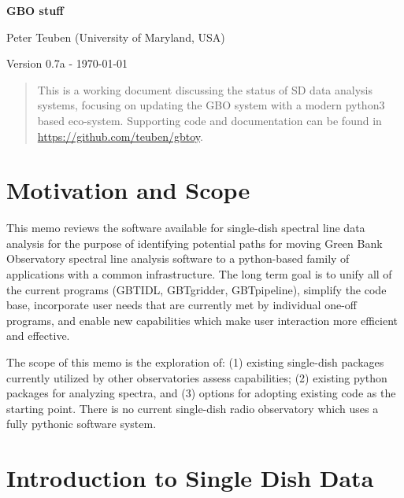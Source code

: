 \documentclass[12pt,a4paper]{article}
\begin{document}
\pagestyle{plain}
 

\begin{center}
{\Large{\bf{  GBO stuff  \\  }}} 

\end{center}
\bigskip

\centerline{Peter Teuben (University of Maryland, USA)}

\centerline{Version 0.7a - \today}
\bigskip

\begin{abstract}

This is a working document discussing the status of SD data analysis
systems, focusing on updating the GBO system with a modern python3
based eco-system. Supporting code and documentation can be found in
\url{https://github.com/teuben/gbtoy}.

\end{abstract}

\section{Motivation and Scope}

This memo reviews the software available for single-dish spectral line data analysis for the purpose of identifying potential paths for moving Green Bank Observatory spectral line analysis software to a python-based family of applications with a common infrastructure. The long term goal is to unify all of the current programs (GBTIDL, GBTgridder, GBTpipeline), simplify the code base, incorporate user needs that are currently met by individual one-off programs, and enable new capabilities which make user interaction more efficient and effective.

The scope of this memo is the exploration of: (1) existing single-dish packages currently utilized by other observatories assess capabilities; (2) existing python packages for analyzing spectra, and (3) options for adopting existing code as the starting point. There is no current single-dish radio observatory which uses a fully pythonic software system.

\section{Introduction to Single Dish Data}
\end{document}
